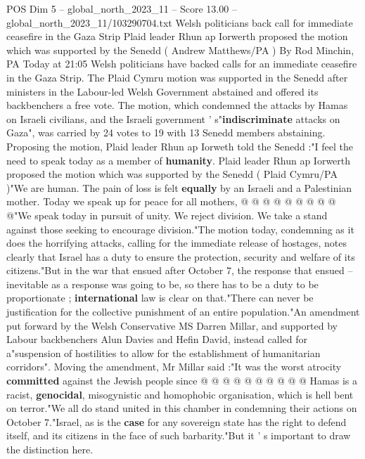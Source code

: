 \begin{textsample}{POS Dim 5 – global\_north\_2023\_11 – Score 13.00 – global\_north\_2023\_11/103290704.txt}  \label{ex:f5_pos_418}
Welsh politicians back call for immediate ceasefire in the Gaza Strip Plaid leader Rhun ap Iorwerth proposed the motion which was supported by the Senedd ( Andrew Matthews/PA ) By Rod Minchin, PA Today at 21:05 Welsh politicians have backed calls for an immediate ceasefire in the Gaza Strip.
The Plaid Cymru motion was supported in the Senedd after ministers in the Labour-led Welsh Government abstained and offered its backbenchers a free vote.
The motion, which condemned the attacks by Hamas on Israeli civilians, and the Israeli government ' s"\textbf{indiscriminate} attacks on Gaza", was carried by 24 votes to 19 with 13 Senedd members abstaining.
Proposing the motion, Plaid leader Rhun ap Iorweth told the Senedd :"I feel the need to speak today as a member of \textbf{humanity}.
Plaid leader Rhun ap Iorwerth proposed the motion which was supported by the Senedd ( Plaid Cymru/PA )"We are human.
The pain of loss is felt \textbf{equally} by an Israeli and a Palestinian mother.
Today we speak up for peace for all mothers, @ @ @ @ @ @ @ @ @ @"We speak today in pursuit of unity.
We reject division.
We take a stand against those seeking to encourage division."The motion today, condemning as it does the horrifying attacks, calling for the immediate release of hostages, notes clearly that Israel has a duty to ensure the protection, security and welfare of its citizens."But in the war that ensued after October 7, the response that ensued -- inevitable as a response was going to be, so there has to be a duty to be proportionate ; \textbf{international} law is clear on that."There can never be justification for the collective punishment of an entire population."An amendment put forward by the Welsh Conservative MS Darren Millar, and supported by Labour backbenchers Alun Davies and Hefin David, instead called for a"suspension of hostilities to allow for the establishment of humanitarian corridors".
Moving the amendment, Mr Millar said :"It was the worst atrocity \textbf{committed} against the Jewish people since @ @ @ @ @ @ @ @ @ @ Hamas is a racist, \textbf{genocidal}, misogynistic and homophobic organisation, which is hell bent on terror."We all do stand united in this chamber in condemning their actions on October 7."Israel, as is the \textbf{case} for any sovereign state has the right to defend itself, and its citizens in the face of such barbarity."But it ' s important to draw the distinction here.

\end{textsample}
